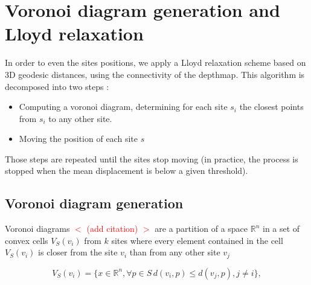 \documentclass[11pt,fleqn]{book} %
\newcommand{\arnaud}[1]{\textcolor{red}{$<$ #1 $>$}}
\begin{document}


\section{Voronoi diagram generation and Lloyd relaxation}
\label{sec:lloyd_relaxation}

In order to even the sites positions, we apply a Lloyd relaxation scheme based on 3D geodesic distances, using the connectivity of the depthmap.
This algorithm is decomposed into two steps : 
\begin{itemize}
	\item Computing a voronoi diagram, determining for each site $s_i$ the closest points from $s_i$ to any other site.
	\item Moving the position of each site $s$
\end{itemize}

Those steps are repeated until the sites stop moving (in practice, the process is stopped when the mean displacement is below a given threshold).

\subsection{Voronoi diagram generation}
Voronoi diagrams \arnaud{(add citation)} are a partition of a space $\mathbb{R}^n$ in a set of convex cells $V_S(v_i)$ from $k$ sites where every element contained in the cell $V_S(v_i)$ is closer from the site $v_i$ than from any other site $v_j$

\begin{equation}
\label{eq:voronoi_cell}
	V_S(v_i) = \{ x \in \mathbb{R}^n, \forall p \in S\, d(v_i,p) \leq d(v_j,p), j \neq i\},
\end{equation}
\end{document}
